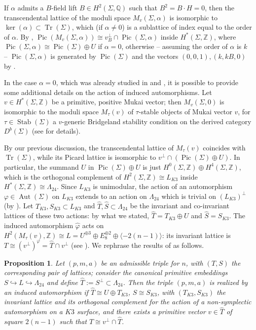 \documentclass{amsart}
\newtheorem{prop}[theorem]{Proposition}
\theoremstyle{definition}
\newcommand{\IZ}{\mathbb{Z}}
\newcommand{\IQ}{\mathbb{Q}}
\newcommand{\coloneqq}{:=}
\DeclareMathOperator{\aut}{Aut}
\DeclareMathOperator{\stabil}{Stab}
\DeclareMathOperator{\pic}{Pic}
\DeclareMathOperator{\trans}{Tr}
\begin{document}
If $\alpha$ admits a $B$-field lift $B \in H^2(\Sigma, \IQ)$ such that $B^2 = B \cdot H = 0$, then the transcendental lattice of the moduli space $M_{v}(\Sigma, \alpha)$ is isomorphic to \mbox{$\ker(\alpha) \subset \trans(\Sigma)$}, which (if $\alpha \neq 0$) is a sublattice of index equal to the order of $\alpha$. By \cite[\S 3]{yoshioka_twisted}, $\pic(M_{v}(\Sigma, \alpha)) \cong v_B^\perp \cap \pic(\Sigma, \alpha)$ inside $H^*(\Sigma, \IZ)$, where $\pic(\Sigma, \alpha) \cong \pic(\Sigma) \oplus U$ if $\alpha = 0$, otherwise -- assuming the order of $\alpha$ is $k$ -- $\pic(\Sigma, \alpha)$ is generated by $\pic(\Sigma)$ and the vectors $(0,0,1), (k, kB, 0)$ by \cite[Lemma 3.1]{macrì_stellari}. 
\smallskip

In the case $\alpha = 0$, which was already studied in \cite{baymacr} and \cite{mw}, it is possible to provide some additional details on the action of induced automorphisms. Let $v \in H^*(\Sigma, \IZ)$ be a primitive, positive Mukai vector; then $M_{v}(\Sigma, 0)$ is isomorphic to the moduli space $M_\tau(v)$ of $\tau$-stable objects of Mukai vector $v$, for $\tau \in \stabil(\Sigma)$ a $v$-generic Bridgeland stability condition on the derived category $D^b(\Sigma)$ (see \cite{bridg} for details).

By our previous discussion, the transcendental lattice of $M_{\tau}(v)$ coincides with $\trans(\Sigma)$, while its Picard lattice is isomorphic to $v^\perp \cap \left( \pic(\Sigma) \oplus U \right)$. In particular, the summand $U$ in $\pic(\Sigma) \oplus U$ is just $H^0(\Sigma, \IZ) \oplus H^4(\Sigma, \IZ)$, which is the orthogonal complement of $H^2(\Sigma, \IZ) \cong L_{K3}$ inside $H^*(\Sigma, \IZ) \cong \Lambda_{24}$. Since $L_{K3}$ is unimodular, the action of an automorphism $\varphi \in \aut(\Sigma)$ on $L_{K3}$ extends to an action on $\Lambda_{24}$ which is trivial on $(L_{K3})^\perp$ (by \cite[Lemma 1.4]{mw}). Let $T_{K3},S_{K3} \subset L_{K3}$ and \mbox{$\hat{T}, \hat{S} \subset \Lambda_{24}$} be the invariant and co-invariant lattices of these two actions: by what we stated, $\hat{T} = T_{K3} \oplus U$ and $\hat{S} = S_{K3}$. The induced automorphism $\hat{\varphi}$ acts on $H^2(M_\tau(v), \IZ) \cong L = U^{\oplus 3} \oplus E_8^{\oplus 2} \oplus \langle -2(n-1)\rangle $: its invariant lattice is $T \cong \left( v^\perp \right)^\varphi = \hat{T} \cap v^\perp$ (see \cite[Lemma 1.34]{mw}). We rephrase the results of \cite[\S 2,3]{mw} as follows.

\begin{prop} \label{prop: induced}
Let $(p,m,a)$ be an admissible triple for $n$, with $(T,S)$ the corresponding pair of lattices; consider the canonical primitive embeddings $S \hookrightarrow L \hookrightarrow \Lambda_{24}$ and define $\hat{T} \coloneqq S^\perp \subset \Lambda_{24}$. Then the triple $(p,m,a)$ is realized by an induced automorphism if $\hat{T} \cong U \oplus T_{K3}$, $S \cong S_{K3}$, with $(T_{K3}, S_{K3})$ the invariant lattice and its orthogonal complement for the action of a non-symplectic automorphism on a $K3$ surface, and there exists a primitive vector $v \in \hat{T}$ of square $2(n-1)$ such that $T \cong v^\perp \cap \hat{T}$.
\end{prop}
\end{document}

